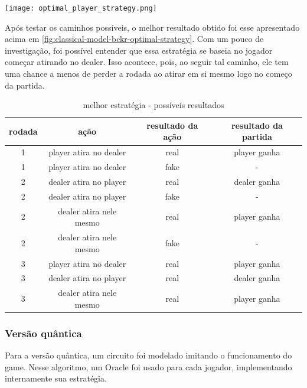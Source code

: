 \documentclass{article}
\begin{document}
\begin{center}
	\texttt{[image: optimal\_player\_strategy.png]}
	\label{fig:classical-model-bckr-optimal-strategy}
\end{center}

Após testar os caminhos possíveis, o melhor resultado obtido foi esse apresentado acima em \ref{fig:classical-model-bckr-optimal-strategy}. Com um pouco de investigação, foi possível entender que essa estratégia se baseia no jogador começar atirando no dealer. Isso acontece, pois, ao seguir tal caminho, ele tem uma chance a menos de perder a rodada ao atirar em si mesmo logo no começo da partida.

\begin{table}[!h]
	\begin{center}
		\begin{tabular}{ |c|c|c|c| } 
			\hline
			rodada & ação & resultado da ação & resultado da partida \\
			\hline
			1 & player atira no dealer  & real & player ganha\\
			\hline
			1 & player atira no dealer  & fake & -\\
			\hline
			2 & dealer atira no player  & real & dealer ganha\\
			\hline
			2 & dealer atira no player  & fake & -\\
			\hline
			2 & dealer atira nele mesmo  & real & player ganha\\
			\hline
			2 & dealer atira nele mesmo  & fake & -\\
			\hline
			3 & player atira no dealer  & real & player ganha\\
			\hline
			3 & dealer atira no player & real & dealer ganha\\
			\hline
			3 & dealer atira nele mesmo  & real & player ganha\\
			\hline
		\end{tabular}
		\caption{melhor estratégia - possíveis resultados}
	\end{center}
\end{table}

\subsubsection{Versão quântica}
Para a versão quântica, um circuito foi modelado imitando o funcionamento do game. Nesse algoritmo, um Oracle foi usado para cada jogador, implementando internamente sua estratégia.
\end{document}

